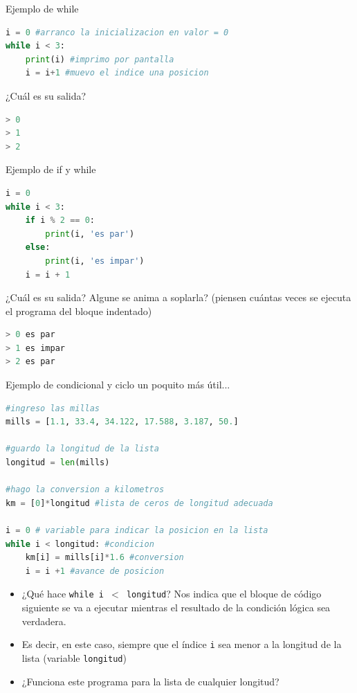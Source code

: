 \documentclass{beamer}
\begin{document}
\begin{frame}[fragile]{Ejemplo de while}
\begin{lstlisting}[language=Python]
i = 0 #arranco la inicializacion en valor = 0
while i < 3:
    print(i) #imprimo por pantalla
    i = i+1 #muevo el indice una posicion
\end{lstlisting} \pause

¿Cuál es su salida? \pause 
\begin{lstlisting}[language=Python]
> 0 
> 1
> 2
\end{lstlisting}
\end{frame}

\begin{frame}[fragile]{Ejemplo de if y while}
\begin{lstlisting}[language=Python]
i = 0
while i < 3:
    if i % 2 == 0:
        print(i, 'es par')
    else:
        print(i, 'es impar')
    i = i + 1

\end{lstlisting} \pause

¿Cuál es su salida? Algune se anima a soplarla? (piensen cuántas veces se ejecuta el programa del bloque indentado) \pause 
\begin{lstlisting}[language=Python]
> 0 es par
> 1 es impar
> 2 es par
\end{lstlisting}
\end{frame}

\begin{frame}[fragile]{Ejemplo de condicional y ciclo un poquito más útil...}
\begin{lstlisting}[language=Python]
#ingreso las millas 
mills = [1.1, 33.4, 34.122, 17.588, 3.187, 50.] 
    
#guardo la longitud de la lista
longitud = len(mills)
    
#hago la conversion a kilometros
km = [0]*longitud #lista de ceros de longitud adecuada
    
i = 0 # variable para indicar la posicion en la lista
while i < longitud: #condicion
    km[i] = mills[i]*1.6 #conversion
    i = i +1 #avance de posicion
\end{lstlisting} \pause

\begin{itemize}
        \item ¿Qué hace \texttt{while i $<$ longitud}? \pause Nos indica que el bloque de código siguiente se va a ejecutar mientras el resultado de la condición lógica sea verdadera. \pause
        \item Es decir, en este caso, siempre que el índice \texttt{i} sea menor a la longitud de la lista (variable \texttt{longitud}) \pause 
        \item ¿Funciona este programa para la lista de cualquier longitud?
\end{itemize}
\end{frame}
\end{document}
